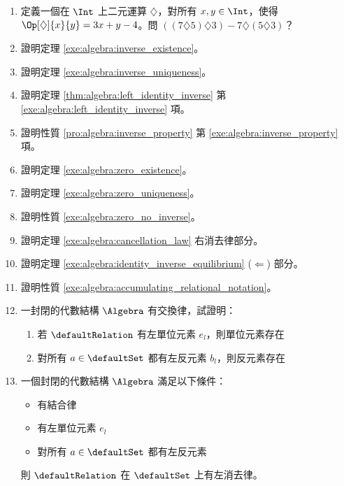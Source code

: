 \documentclass[12pt,a4paper,oneside]{report}
\begin{document}
\begin{CJK}{UTF8}{bkai}
\begin{enumerate}
\item 定義一個在 $\Int$ 上二元運算 $\diamondsuit$，對所有 $x,y\in{\Int}$，使得 $\Op[\diamondsuit]{x}{y}=3x+y-4$。問 ${({(7\diamondsuit{5})}\diamondsuit{3})}-{7\diamondsuit{(5\diamondsuit{3})}}$？
\item 證明定理 \ref{exe:algebra:inverse_existence}。
\item 證明定理 \ref{exe:algebra:inverse_uniqueness}。
\item 證明定理 \ref{thm:algebra:left_identity_inverse} 第 \ref{exe:algebra:left_identity_inverse} 項。
\item 證明性質 \ref{pro:algebra:inverse_property} 第 \ref{exe:algebra:inverse_property} 項。
\item 證明定理 \ref{exe:algebra:zero_existence}。
\item 證明定理 \ref{exe:algebra:zero_uniqueness}。
\item 證明性質 \ref{exe:algebra:zero_no_inverse}。
\item 證明定理 \ref{exe:algebra:cancellation_law} 右消去律部分。
\item 證明定理 \ref{exe:algebra:identity_inverse_equilibrium} ($\Leftarrow$) 部分。
\item 證明性質 \ref{exe:algebra:accumulating_relational_notation}。
\item 一封閉的代數結構 $\Algebra$ 有交換律，試證明：
\begin{enumerate}
\item 若 $\defaultRelation$ 有左單位元素 $e_l$，則單位元素存在
\item 對所有 $a\in{\defaultSet}$ 都有左反元素 $b_l$，則反元素存在
\end{enumerate}
\item 一個封閉的代數結構 $\Algebra$ 滿足以下條件：
\begin{itemize}
\item 有結合律
\item 有左單位元素 $e_l$
\item 對所有 $a\in{\defaultSet}$ 都有左反元素
\end{itemize}
則 $\defaultRelation$ 在 $\defaultSet$ 上有左消去律。
\end{enumerate}

\ifx \allfiles \undefined
\printindex[noun]

\clearpage
\end{CJK}
\end{document}
